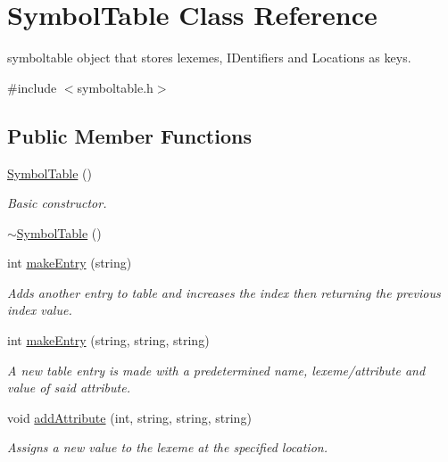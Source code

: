 \hypertarget{classSymbolTable}{
\section{SymbolTable Class Reference}
\label{classSymbolTable}
}


symboltable object that stores lexemes, IDentifiers and Locations as keys.  




{\ttfamily \#include $<$symboltable.h$>$}

\subsection*{Public Member Functions}
\begin{DoxyCompactItemize}
\item 
\hyperlink{classSymbolTable_a1fbe6cec5594463b766db0ac58c9aa1d}{SymbolTable} ()
\begin{DoxyCompactList}\small\item\em Basic constructor. \item\end{DoxyCompactList}\item 
\hyperlink{classSymbolTable_a5d5ae9b5b22d87691cec9ec17cfff650}{$\sim$SymbolTable} ()
\item 
int \hyperlink{classSymbolTable_a1df7dfc3592c924e8c8a9fea1e13bf89}{makeEntry} (string)
\begin{DoxyCompactList}\small\item\em Adds another entry to table and increases the index then returning the previous index value. \item\end{DoxyCompactList}\item 
int \hyperlink{classSymbolTable_a064e30f7ddbd4065244d1d41ea885737}{makeEntry} (string, string, string)
\begin{DoxyCompactList}\small\item\em A new table entry is made with a predetermined name, lexeme/attribute and value of said attribute. \item\end{DoxyCompactList}\item 
void \hyperlink{classSymbolTable_ac7a86e820025627863b4277cf84353a0}{addAttribute} (int, string, string, string)
\begin{DoxyCompactList}\small\item\em Assigns a new value to the lexeme at the specified location. \item\end{DoxyCompactList}\item 

\end{DoxyCompactItemize}
